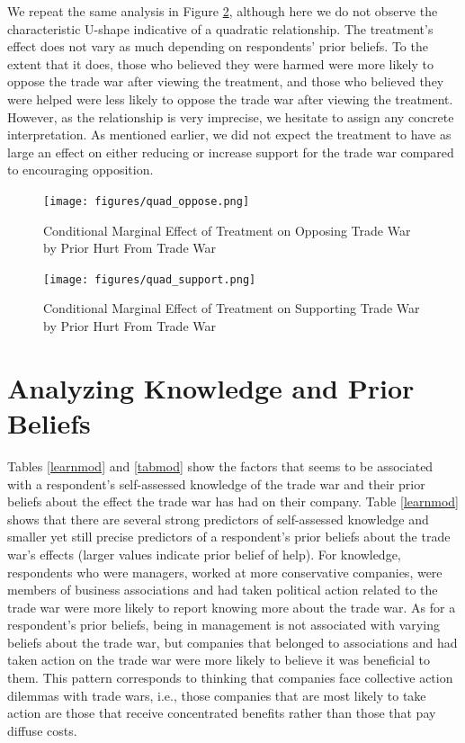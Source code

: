 We repeat the same analysis in Figure \ref{qsupp}, although here we do not observe the characteristic U-shape indicative of a quadratic relationship. The treatment's effect does not vary as much depending on respondents' prior beliefs. To the extent that it does, those who believed they were harmed were more likely to oppose the trade war after viewing the treatment, and those who believed they were helped were less likely to oppose the trade war after viewing the treatment. However, as the relationship is very imprecise, we hesitate to assign any concrete interpretation. As mentioned earlier, we did not expect the treatment to have as large an effect on either reducing or increase support for the trade war compared to encouraging opposition.

\begin{figure}
    \centering
    \texttt{[image: figures/quad\_oppose.png]}
    \caption{Conditional Marginal Effect of Treatment on Opposing Trade War by Prior Hurt From Trade War}
    \label{qopp}
\end{figure}

\begin{figure}
    \centering
    \texttt{[image: figures/quad\_support.png]}
    \caption{Conditional Marginal Effect of Treatment on Supporting Trade War by Prior Hurt From Trade War}
    \label{qsupp}
\end{figure}


\section{Analyzing Knowledge and Prior Beliefs}


Tables \ref{learnmod} and \ref{tabmod} show the factors that seems to be associated with a respondent's self-assessed knowledge of the trade war and their prior beliefs about the effect the trade war has had on their company. Table \ref{learnmod} shows that there are several strong predictors of self-assessed knowledge and smaller yet still precise predictors of a respondent's prior beliefs about the trade war's effects (larger values indicate prior belief of help). For knowledge, respondents who were managers, worked at more conservative companies, were members of business associations and had taken political action related to the trade war were more likely to report knowing more about the trade war. As for a respondent's prior beliefs, being in management is not associated with varying beliefs about the trade war, but companies that belonged to associations and had taken action on the trade war were more likely to believe it was beneficial to them. This pattern corresponds to thinking that companies face collective action dilemmas with trade wars, i.e., those companies that are most likely to take action are those that receive concentrated benefits rather than those that pay diffuse costs.

